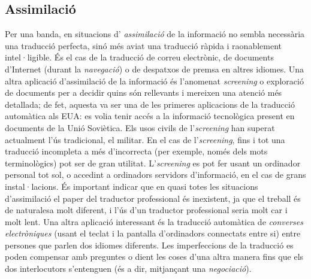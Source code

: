 \subsection{Assimilació} 
\label{s3:assim}
Per una banda, en situacions d'{\em
assimilació} de la informació no sembla necessària una
traducció perfecta, sinó més aviat una traducció ràpida
i raonablement intel·ligible. És el cas de la traducció de
correu electrònic, de documents d'Internet (durant la \emph{navegació})
o de despatxos de premsa
en altres idiomes.  Una altra aplicació d'assimilació de la
informació és l'anomenat \emph{screening} o exploració de
documents per a decidir quins són rellevants i mereixen una atenció
més detallada; de fet, aquesta va ser una de les primeres aplicacions de la
traducció automàtica als EUA: es volia tenir accés a la
informació tecnològica present en documents de la Unió
Soviètica. Els usos civils de l'\emph{screening} han superat actualment
l'ús tradicional, el militar. En el cas de l'\emph{screening}, fins i tot
una traducció incompleta a més d'incorrecta (per exemple, només
dels mots terminològics) pot ser de gran utilitat.  L'\emph{screening} es
pot fer usant un ordinador personal tot sol, o accedint a ordinadors
servidors d'informació, en el cas de grans instal·lacions. És
important indicar que en quasi totes les situacions d'assimilació el
paper del traductor professional és inexistent, ja que el treball és
de naturalesa molt diferent, i l'ús d'un traductor professional seria
molt car i molt lent.  Una altra aplicació interessant és la
traducció automàtica de \emph{converses electròniques} (usant
el teclat i
la pantalla d'ordinadors connectats entre si) 
entre persones que parlen dos idiomes diferents. Les imperfeccions
de la traducció es poden compensar amb preguntes o dient les coses d'una
altra manera fins que els dos interlocutors s'entenguen (és a dir,
mitjançant una \emph{negociació}).

